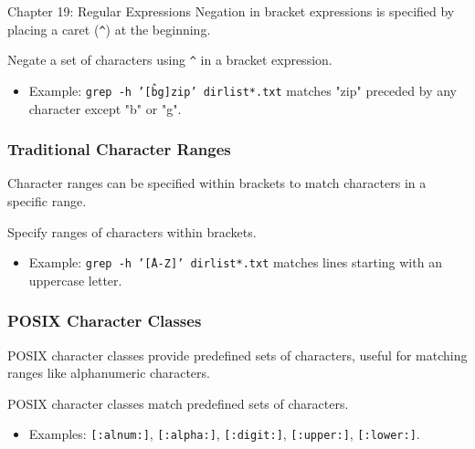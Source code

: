 \begin{notes}{Chapter 19: Regular Expressions}
    Negation in bracket expressions is specified by placing a caret (\texttt{\^}) at the beginning.
    
    \begin{highlight}[Negation]
    
    Negate a set of characters using \texttt{\^} in a bracket expression.
    
    \begin{itemize}
        \item Example: \texttt{grep -h '[\^bg]zip' dirlist*.txt} matches "zip" preceded by any character except "b" or "g".
    \end{itemize}
    
    \end{highlight}
    
    \subsubsection*{Traditional Character Ranges}
    
    Character ranges can be specified within brackets to match characters in a specific range.
    
    \begin{highlight}
    
    Specify ranges of characters within brackets.
    
    \begin{itemize}
        \item Example: \texttt{grep -h '\^[A-Z]' dirlist*.txt} matches lines starting with an uppercase letter.
    \end{itemize}
    
    \end{highlight}
    
    \subsubsection*{POSIX Character Classes}
    
    POSIX character classes provide predefined sets of characters, useful for matching ranges like alphanumeric characters.
    
    \begin{highlight}
    
    POSIX character classes match predefined sets of characters.
    
    \begin{itemize}
        \item Examples: \texttt{[:alnum:]}, \texttt{[:alpha:]}, \texttt{[:digit:]}, \texttt{[:upper:]}, \texttt{[:lower:]}.
    \end{itemize}
    

\end{highlight}
\end{notes}
